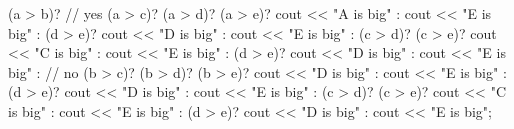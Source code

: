 (a > b)?
// yes
    (a > c)?
    (a > d)?
    (a > e)?
    cout << "A is big"
    :
    cout << "E is big"
    :
    (d > e)?
    cout << "D is big"
    :
    cout << "E is big"
    :
    (c > d)?
    (c > e)?
    cout << "C is big"
    :
    cout << "E is big"
    :
    (d > e)?
    cout << "D is big"
    :
    cout << "E is big"
:
// no
(b > c)?
    (b > d)?
    (b > e)?
    cout << "D is big"
    :
    cout << "E is big"
    :
    (d > e)?
    cout << "D is big"
    :
    cout << "E is big"
:
(c > d)?
    (c > e)?
    cout << "C is big"
    :
    cout << "E is big"
:
(d > e)?
cout << "D is big"
:
cout << "E is big";
